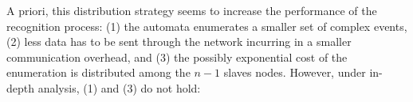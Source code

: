 


A priori, this distribution strategy seems to increase the performance of the recognition process: (1) the automata enumerates a smaller set of complex events, (2) less data has to be sent through the network incurring in a smaller communication overhead, and (3) the possibly exponential cost of the enumeration is distributed among the $n - 1$ slaves nodes. However, under in-depth analysis, (1) and (3) do not hold:

